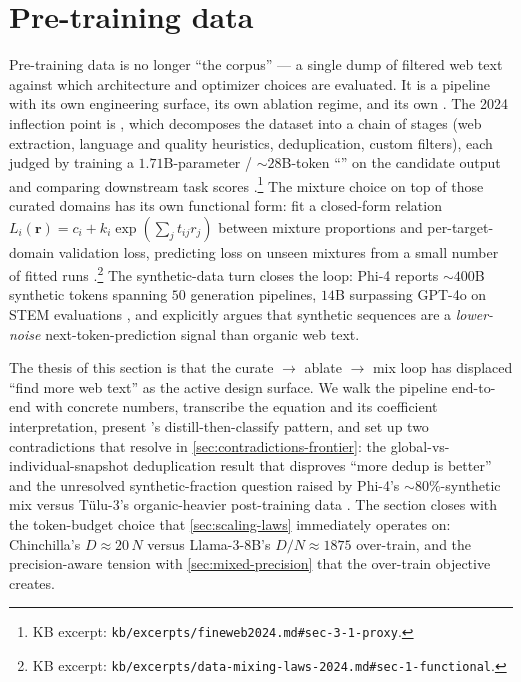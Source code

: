 
\section{Pre-training data}
\label{sec:pre-training-data}
\label{sec:pretrain-data}

Pre-training data is no longer ``the corpus'' --- a single dump of
filtered web text against which architecture and optimizer choices
are evaluated. It is a pipeline with its own engineering surface,
its own ablation regime, and its own . The 2024 inflection
point is  \citep{fineweb2024}, which decomposes the dataset
into a chain of stages (web extraction, language and quality
heuristics, deduplication, custom filters), each judged by training a
$1.71$B-parameter / $\sim 28$B-token ``'' on the
candidate output and comparing downstream task scores
\citep[\S 3.1]{fineweb2024}.\footnote{KB excerpt:
\nolinkurl{kb/excerpts/fineweb2024.md#sec-3-1-proxy}.} The mixture
choice on top of those curated domains has its own functional form:
\citet{data-mixing-laws-2024} fit a closed-form relation
$L_i(\mathbf{r}) = c_i + k_i \exp(\sum_j t_{ij} r_j)$ between
mixture proportions and per-target-domain validation loss, predicting
loss on unseen mixtures from a small number of fitted runs
\citep[\S 1, eq.\ 1]{data-mixing-laws-2024}.\footnote{KB excerpt:
\nolinkurl{kb/excerpts/data-mixing-laws-2024.md#sec-1-functional}.} The
synthetic-data turn closes the loop: Phi-4 \citep{phi4} reports
$\sim 400$B synthetic tokens spanning $50$ generation pipelines,
$14$B  surpassing GPT-4o on STEM evaluations
\citep[\S 1, Table 1]{phi4}, and explicitly argues that synthetic
sequences are a \emph{lower-noise} next-token-prediction signal than
organic web text.

The thesis of this section is that the curate $\to$ ablate $\to$ mix
loop has displaced ``find more web text'' as the active design
surface. We walk the  pipeline end-to-end with concrete
numbers, transcribe the  equation and its coefficient
interpretation, present 's distill-then-classify pattern,
and set up two contradictions that resolve in
\cref{sec:contradictions-frontier}: the global-vs-individual-snapshot
deduplication result that disproves ``more dedup is better''
\citep[\S 3.4]{fineweb2024} and the unresolved synthetic-fraction
question raised by Phi-4's $\sim\!80\%$-synthetic mix versus
Tülu-3's organic-heavier post-training data
\citep{tulu3}. The section closes with the token-budget choice that
\cref{sec:scaling-laws} immediately operates on: Chinchilla's
$D \approx 20\,N$ versus Llama-3-8B's $D / N \approx 1875$
over-train, and the precision-aware tension with \cref{sec:mixed-precision}
that the over-train objective creates.

